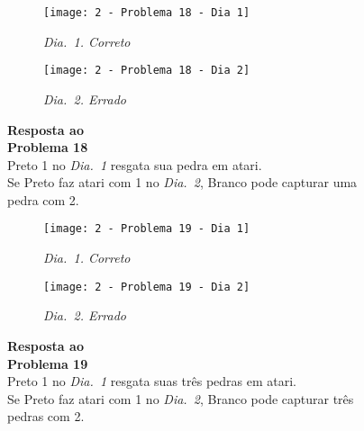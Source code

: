 \begin{SCfigure}[][h!]
    \begin{subfigure}[t]{.31\textwidth}
        \texttt{[image: 2 - Problema 18 - Dia 1]}
        \captionsetup{justification=centering}
        \caption*{\emph{Dia.\@~1. Correto}}
    \end{subfigure}
    \hfill
    \begin{subfigure}[t]{.31\textwidth}
        \texttt{[image: 2 - Problema 18 - Dia 2]}
        \captionsetup{justification=centering}
        \caption*{\emph{Dia.\@~2. Errado}}
    \end{subfigure}
    \hfill
    \caption*{\textbf{Resposta ao\\Problema 18}\\\vspace*{.25cm}Preto 1 no \emph{Dia.\@~1} resgata sua pedra em atari.\\\vspace*{.25cm}Se Preto faz atari com 1 no \emph{Dia.\@~2}, Branco pode capturar uma pedra com 2.}
\end{SCfigure}

\pagebreak

\begin{SCfigure}[][h!]
    \begin{subfigure}[t]{.31\textwidth}
        \texttt{[image: 2 - Problema 19 - Dia 1]}
        \captionsetup{justification=centering}
        \caption*{\emph{Dia.\@~1. Correto}}
    \end{subfigure}
    \hfill
    \begin{subfigure}[t]{.31\textwidth}
        \texttt{[image: 2 - Problema 19 - Dia 2]}
        \captionsetup{justification=centering}
        \caption*{\emph{Dia.\@~2. Errado}}
    \end{subfigure}
    \hfill
    \caption*{\textbf{Resposta ao\\Problema 19}\\\vspace*{.25cm}Preto 1 no \emph{Dia.\@~1} resgata suas três pedras em atari.\\\vspace*{.25cm}Se Preto faz atari com 1 no \emph{Dia.\@~2}, Branco pode capturar três pedras com 2.}
\end{SCfigure}

\vfill


